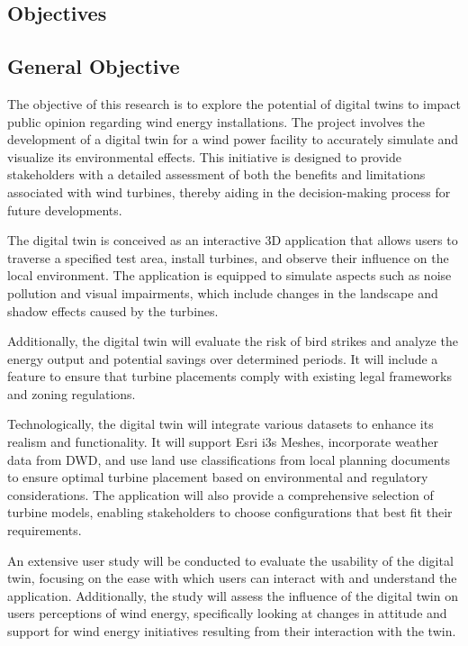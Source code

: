 \documentclass[11pt, titlepage, a4paper]{article}
\begin{document}
\begin{linenumbers}
    \section{Objectives}
    \subsection{General Objective}
    The objective of this research is to explore the potential of digital twins to impact public opinion regarding wind energy installations. The project involves the development of a digital twin for a wind power facility to accurately simulate and visualize its environmental effects. This initiative is designed to provide stakeholders with a detailed assessment of both the benefits and limitations associated with wind turbines, thereby aiding in the decision-making process for future developments.

    The digital twin is conceived as an interactive 3D application that allows users to traverse a specified test area, install turbines, and observe their influence on the local environment. The application is equipped to simulate aspects such as noise pollution and visual impairments, which include changes in the landscape and shadow effects caused by the turbines.

    Additionally, the digital twin will evaluate the risk of bird strikes and analyze the energy output and potential savings over determined periods. It will include a feature to ensure that turbine placements comply with existing legal frameworks and zoning regulations.

    Technologically, the digital twin will integrate various datasets to enhance its realism and functionality. It will support Esri i3s Meshes, incorporate weather data from DWD, and use land use classifications from local planning documents %
    to ensure optimal turbine placement based on environmental and regulatory considerations. The application will also provide a comprehensive selection of turbine models, enabling stakeholders to choose configurations that best fit their requirements.

    An extensive user study will be conducted to evaluate the usability of the digital twin, focusing on the ease with which users can interact with and understand the application. Additionally, the study will assess the influence of the digital twin on users perceptions of wind energy, specifically looking at changes in attitude and support for wind energy initiatives resulting from their interaction with the twin.






\end{linenumbers}
\end{document}
